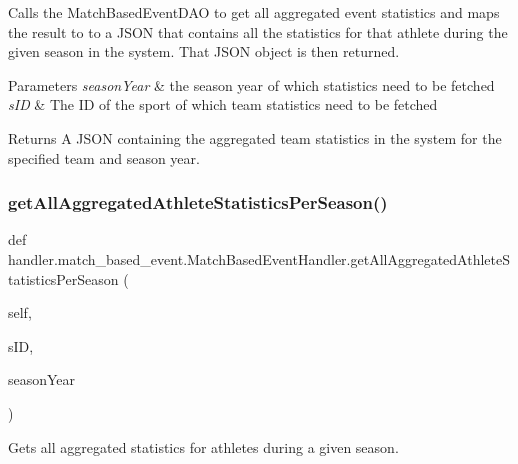 Calls the Match\+Based\+Event\+D\+AO to get all aggregated event statistics and maps the result to to a J\+S\+ON that contains all the statistics for that athlete during the given season in the system. That J\+S\+ON object is then returned.


\begin{DoxyParams}{Parameters}
{\em season\+Year} & the season year of which statistics need to be fetched \\
\hline
{\em s\+ID} & The ID of the sport of which team statistics need to be fetched\\
\hline
\end{DoxyParams}
\begin{DoxyReturn}{Returns}
A J\+S\+ON containing the aggregated team statistics in the system for the specified team and season year. 
\end{DoxyReturn}
\mbox{\label{classhandler_1_1match__based__event_1_1_match_based_event_handler_ae2ff50d766972ce4dec4c4e10e531873}} 
\subsubsection{\texorpdfstring{get\+All\+Aggregated\+Athlete\+Statistics\+Per\+Season()}{getAllAggregatedAthleteStatisticsPerSeason()}}
{\footnotesize\ttfamily def handler.\+match\+\_\+based\+\_\+event.\+Match\+Based\+Event\+Handler.\+get\+All\+Aggregated\+Athlete\+Statistics\+Per\+Season (\begin{DoxyParamCaption}\item[{}]{self,  }\item[{}]{s\+ID,  }\item[{}]{season\+Year }\end{DoxyParamCaption})}



Gets all aggregated statistics for athletes during a given season. 

